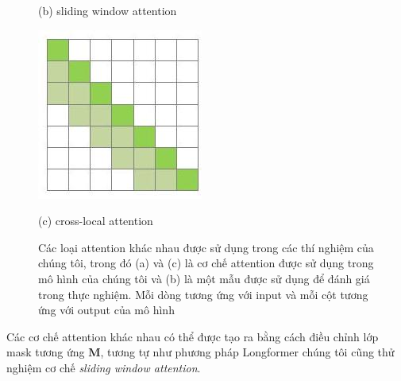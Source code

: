 \begin{figure}[ht]
\begin{minipage}[b]{0.25\textwidth}
    \caption*{(b) sliding window attention}
\end{minipage}
\hfill
\begin{minipage}[b]{0.25\textwidth}
\centering
    \includegraphics[width=\textwidth]{images/cross_attention.jpg}
    \caption*{(c) cross-local attention}
\end{minipage}
\caption[Các loại attention khác nhau (full self-attention, sliding window attention, cross-local attention)]{Các loại attention khác nhau được sử dụng trong các thí nghiệm của chúng tôi, trong đó (a) và (c) là cơ chế attention được sử dụng trong mô hình của chúng tôi và (b) là một mẫu được sử dụng để đánh giá trong thực nghiệm. Mỗi dòng tương ứng với input và mỗi cột tương ứng với output của mô hình}
\end{figure}




Các cơ chế attention khác nhau có thể được tạo ra bằng cách điều chỉnh lớp mask tương ứng $\mathbf{M}$, 
tương tự như phương pháp Longformer \cite{beltagy2020longformer} chúng tôi cũng thử nghiệm cơ chế \textit{sliding window attention}.

